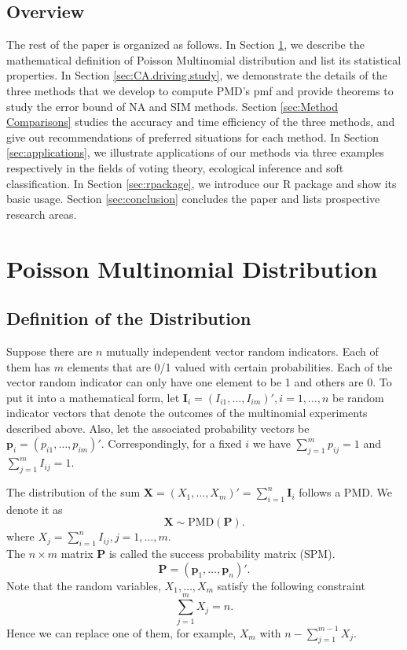 \documentclass[12pt]{article}
\newcommand{\Ivec}{{\boldsymbol{I}}}
\newcommand{\Pmat}{\mathbf{P}}
\newcommand{\pvec}{\boldsymbol{p}}
\newcommand{\PMD}{\textrm{PMD}}
\newcommand{\Xvec}{\boldsymbol{X}}
\newcommand{\SIM}{{\textrm{SIM}}}
\newcommand{\NA}{{\textrm{NA}}}
\begin{document}
\subsection{Overview}
The rest of the paper is organized as follows. In Section \ref{sec:pmd}, we describe the mathematical definition of Poisson Multinomial distribution and list its statistical properties. In Section \ref{sec:CA.driving.study}, we demonstrate the details of  the three methods that we develop to compute $\PMD$'s pmf and provide theorems to study the error bound of $\NA$ and $\SIM$ methods. Section \ref{sec:Method Comparisons} studies the accuracy and time efficiency of the three methods, and give out recommendations of preferred situations for each method. In Section \ref{sec:applications}, we illustrate applications of our methods via three examples respectively in the fields of voting theory, ecological inference and soft classification. In Section \ref{sec:rpackage}, we introduce our R package and show its basic usage. Section \ref{sec:conclusion} concludes the paper and lists prospective research areas.




\section{Poisson Multinomial Distribution} \label{sec:pmd}
\subsection{Definition of the Distribution}
Suppose there are $n$ mutually independent vector random indicators. Each of them has $m$ elements that are 0/1 valued with certain probabilities. Each of the vector random indicator can only have one element to be 1 and others are 0. To put it into a mathematical form, let $\Ivec_{i} = (I_{i1}, \dots, I_{im})', i=1, \dots, n$ be random indicator vectors that denote the outcomes of the multinomial experiments described above. Also, let the associated probability vectors be $\pvec_{i} = (p_{i1}, \dots, p_{im})'$. Correspondingly, for a fixed $i$ we have $\sum_{j=1}^{m}p_{ij}=1$ and $\sum_{j=1}^{m}I_{ij}=1$.

 The distribution of the sum $\Xvec = (X_{1}, \dots, X_{m})'= \sum_{i=1}^{n}\Ivec_{i}$ follows a PMD. We denote it as
$$\Xvec \sim \PMD(\Pmat).$$ where $X_{j} = \sum_{i=1}^{n} I_{ij}, j=1,\dots,m$. \\
The $n \times m$ matrix $\Pmat$ is called the success probability matrix (SPM).
\begin{equation*}
\Pmat = (\pvec_{1}, \dots, \pvec_{n} )'.
\end{equation*}
Note that the random variables, $X_1, \dots, X_{m}$ satisfy the following constraint $$\sum_{j=1}^{m}X_{j} = n.$$ Hence we can replace one of them, for example, $X_m$ with $n-\sum_{j=1}^{m-1}X_j$.
\end{document}
